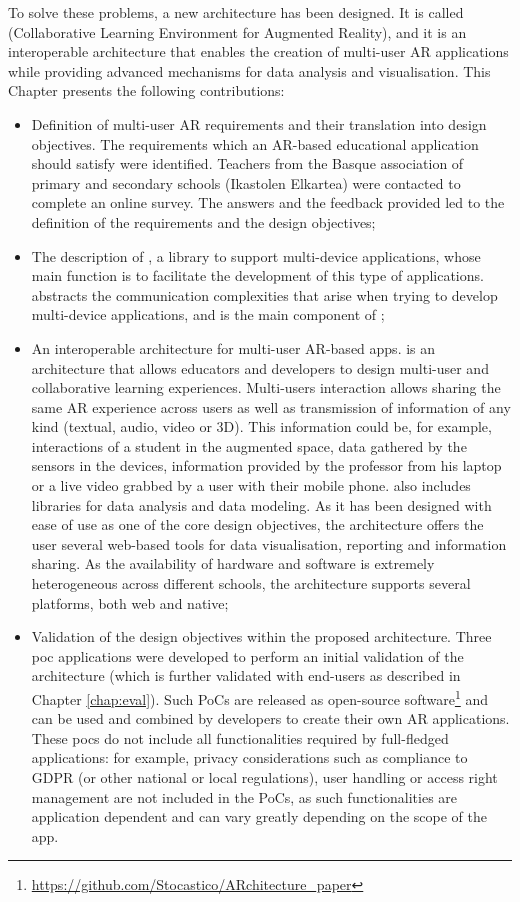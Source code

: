To solve these problems, a new architecture has been designed. It is called \arch{} (Collaborative Learning Environment for Augmented Reality), and it is an interoperable architecture that enables the creation of multi-user AR applications while providing advanced mechanisms for data analysis and visualisation. This Chapter presents the following contributions:
\begin{itemize}
    \item Definition of multi-user AR requirements and their translation into design objectives. The requirements which an AR-based educational application should satisfy were identified. Teachers from the Basque association of primary and secondary schools (Ikastolen Elkartea) were contacted to complete an online survey. The answers and the feedback provided led to the definition of the requirements and the design objectives;
    \item The description of \textit{\ork{}}, a library to support multi-device applications, whose main function is to facilitate the development of this type of applications. \textit{\ork{}} abstracts the communication complexities that arise when trying to develop multi-device applications, and is the main component of \arch{};
    \item An interoperable architecture for multi-user AR-based apps. \arch{} is an architecture that allows educators and developers to design multi-user and collaborative learning experiences. Multi-users interaction allows sharing the same AR experience across users as well as transmission of information of any kind (textual, audio, video or 3D). This information could be, for example, interactions of a student in the augmented space, data gathered by the sensors in the devices, information provided by the professor from his laptop or a live video grabbed by a user with their mobile phone. \arch{} also includes libraries for data analysis and data modeling. As it has been designed with ease of use as one of the core design objectives, the architecture offers the user several web-based tools for data visualisation, reporting and information sharing. As the availability of hardware and software is extremely heterogeneous across different schools, the architecture supports several platforms, both web and native;
    \item Validation of the design objectives within the proposed architecture. Three \gls{poc} applications were developed to perform an initial validation of the architecture (which is further validated with end-users as described in Chapter \ref{chap:eval}). Such PoCs are released as open-source software\footnote{\url{https://github.com/Stocastico/ARchitecture_paper}} and can be used and combined by developers to create their own AR applications. These \glspl{poc} do not include all functionalities required by full-fledged applications: for example, privacy considerations such as compliance to GDPR (or other national or local regulations), user handling or access right management are not included in the PoCs, as such functionalities are application dependent and can vary greatly depending on the scope of the app.
\end{itemize}


